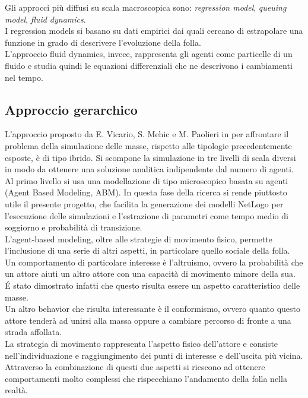 Gli approcci più diffusi su scala macroscopica sono: \textit{regression model}, \textit{queuing model}, \textit{fluid dynamics}.\\
I regression models si basano su dati empirici dai quali cercano di estrapolare una funzione in grado di descrivere l'evoluzione della folla.\\
L'approccio fluid dynamics, invece, rappresenta gli agenti come particelle di un fluido e studia quindi le equazioni differenziali che ne descrivono i cambiamenti nel tempo.
\subsection{Approccio gerarchico}
\label{subsec:approccio-gerarchico}
L'approccio proposto da E. Vicario, S. Mehic e M. Paolieri  in \cite{hierarchical-report} per affrontare il problema della simulazione delle masse, rispetto alle tipologie precedentemente esposte, è di tipo ibrido. Si scompone la simulazione in tre livelli di scala diversi in modo da ottenere una soluzione analitica indipendente dal numero di agenti.\\
Al primo livello si usa una modellazione di tipo microscopico basata su agenti (Agent Based Modeling, ABM). In questa fase della ricerca si rende piuttosto utile il presente progetto, che facilita la generazione dei modelli NetLogo per l'esecuzione delle simulazioni e l'estrazione di parametri come tempo medio di soggiorno e probabilità di transizione.\\
L'agent-based modeling, oltre alle strategie di movimento fisico, permette l'inclusione di una serie di altri aspetti, in particolare quello sociale della folla.\\
Un comportamento di particolare interesse è l'altruismo, ovvero la probabilità che un attore aiuti un altro attore con una capacità di movimento minore della sua. \'E stato dimostrato infatti che questo risulta essere un aspetto caratteristico delle masse.\\
Un altro behavior che risulta interessante è il conformismo, ovvero quanto questo attore tenderà ad unirsi alla massa oppure a cambiare percorso di fronte a una strada affollata.\\
La strategia di movimento rappresenta l'aspetto fisico dell'attore e consiste nell'individuazione e raggiungimento dei punti di interesse e dell'uscita più vicina.\\
Attraverso la combinazione di questi due aspetti si riescono ad ottenere comportamenti molto complessi che rispecchiano l'andamento della folla nella realtà.\\
